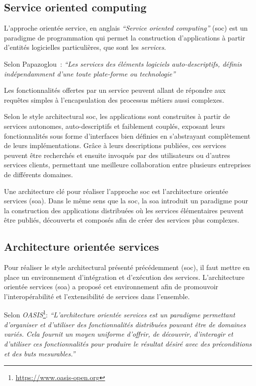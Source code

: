   \subsection{Service oriented computing}
  \label{sec:soc}
  L'approche orientée service, en anglais \textit{``Service oriented
    computing''} (\acrshort{soc}) est un paradigme de programmation
  qui permet la construction d'applications à partir d'entités
  logicielles particulières, que sont les \emph{services}.\bigskip

  Selon Papazoglou~\cite{papazoglou2003service}: \textit{``Les
    services des éléments logiciels auto-descriptifs, définis
    indépendamment d'une toute plate-forme ou technologie''}\bigskip

  Les fonctionnalités offertes par un service peuvent allant de
  répondre aux requêtes simples à l'encapsulation des processus
  métiers aussi complexes.\medskip

  Selon le style architectural \acrshort{soc}, les applications sont
  construites à partir de services autonomes, auto-descriptifs et
  faiblement couplés, exposant leurs fonctionnalités sous forme
  d'interfaces bien définies en s'abstrayant complètement de leurs
  implémentations. Grâce à leurs descriptions publiées, ces services
  peuvent être recherchés et ensuite invoqués par des utilisateurs ou
  d'autres services clients, permettant une meilleure collaboration
  entre plusieurs entreprises de différents domaines.\medskip

  Une architecture clé pour réaliser l'approche \acrshort{soc} est
  l'architecture orientée services (\acrshort{soa}). Dans le même
  sens que la \acrshort{soc}, la \acrshort{soa} introduit un paradigme
  pour la construction des applications distribuées où les services
  élémentaires peuvent être publiés, découverts et composés afin de
  créer des services plus complexes.

  \subsection{Architecture orientée services}
  \label{sec:soa}
  Pour réaliser le style architectural présenté précédemment
  (\acrshort{soc}), il faut mettre en place un environnement
  d'intégration et d'exécution des services. L'architecture orientée
  services (\acrshort{soa}) a proposé cet environnement afin de
  promouvoir l'interopérabilité et l'extensibilité de services dans
  l'ensemble.\bigskip

  Selon \textit{OASIS}\footnote{\url{https://www.oasis-open.org}}:
  \textit{``L'architecture orientée services est un paradigme
    permettant d'organiser et d'utiliser des fonctionnalités
    distribuées pouvant être de domaines variés. Cela fournit un moyen
    uniforme d'offrir, de découvrir, d'interagir et d'utiliser ces
    fonctionnalités pour produire le résultat désiré avec des
    préconditions et des buts mesurables.''}\bigskip

